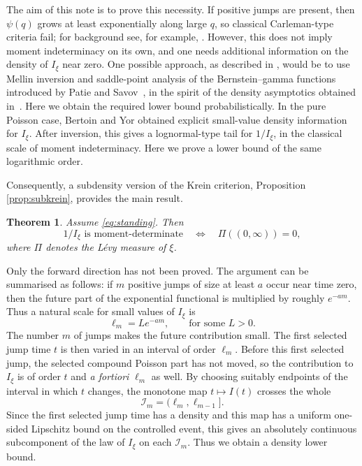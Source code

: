 \documentclass[11pt]{article}
\newtheorem{theorem}{Theorem}[section]
\newcommand{\1}{\mathbf 1}
\begin{document}
The aim of this note is to prove this necessity. If positive jumps are present, then $\psi(q)$ grows at least exponentially along large $q$, so classical Carleman-type criteria fail; for background see, for example, \cite{Lin-2017,Stoyanov-Lin-Kopanov-2020}. However, this does not imply moment indeterminacy on its own, and one needs additional information on the density of $I_\xi$ near zero.
    One possible approach, as described in \cite[Remark 3.7]{Minchev-Savov-2026}, would be to use Mellin inversion and saddle-point analysis of the Bernstein--gamma functions introduced by Patie and Savov~\cite{Patie-Savov-2018}, in the spirit of the density asymptotics obtained in~\cite{Minchev-Savov-2023}. Here we obtain the required lower bound probabilistically.
   In the pure Poisson case, Bertoin and Yor \cite[Section~4]{Bertoin-Yor-2002} obtained explicit small-value density information for $I_\xi$. After inversion, this gives a lognormal-type tail for $1/I_\xi$, in the classical scale of moment indeterminacy. Here we prove a lower bound of the same logarithmic order.

Consequently, a subdensity version of the Krein criterion, Proposition \ref{prop:subkrein}, provides the main result. 

\begin{theorem}\label{thm:main}
Assume \eqref{eq:standing}. Then
\[
 1/I_\xi\text{ is moment-determinate}
 \quad\iff\quad
 \Pi((0,\infty))=0,
\]
where $\Pi$ denotes the Lévy measure of $\xi$.
\end{theorem}

Only the forward direction has not been proved. The argument can be summarised as follows: if $m$ positive jumps of size at least $a$ occur near time zero, then the future part of the exponential functional is multiplied by roughly $e^{-am}$. Thus a natural scale for small values of $I_\xi$ is \[
 \ell_m=L e^{-am},
 \qquad \text{for some $L>0$}.
\]
The number $m$ of jumps makes the future contribution small. The first selected jump time $t$ is then varied in an interval of order $\ell_m$. Before this first selected jump, the selected compound Poisson part has not moved, so the contribution to $I_\xi$ is of order $t$ and \textit{a fortiori} $\ell_m$ as well. By choosing  suitably endpoints of the interval in which $t$ changes, the monotone map $t\mapsto I(t)$ crosses the whole
\[
\mathcal I_m=(\ell_m,\ell_{m-1}].
\]
Since the first selected jump time has a density and this map has a uniform one-sided Lipschitz bound on the controlled event, this gives an absolutely continuous subcomponent of the law of $I_\xi$ on each $\mathcal I_m$. Thus we obtain a density lower bound.
\end{document}
